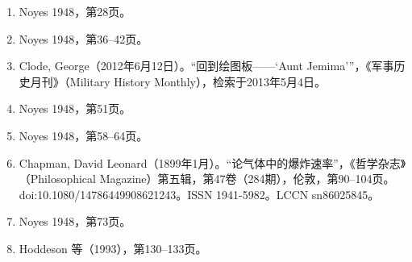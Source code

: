 \begin{enumerate}
\item Noyes 1948，第28页。
\item Noyes 1948，第36–42页。
\item Clode, George（2012年6月12日）。“回到绘图板——‘Aunt Jemima’”，《军事历史月刊》（Military History Monthly），检索于2013年5月4日。
\item Noyes 1948，第51页。
\item Noyes 1948，第58–64页。
\item Chapman, David Leonard（1899年1月）。“论气体中的爆炸速率”，《哲学杂志》（Philosophical Magazine）第五辑，第47卷（284期），伦敦，第90–104页。doi:10.1080/14786449908621243。ISSN 1941-5982。LCCN sn86025845。
\item Noyes 1948，第73页。
\item Hoddeson 等（1993），第130–133页。

\end{enumerate}